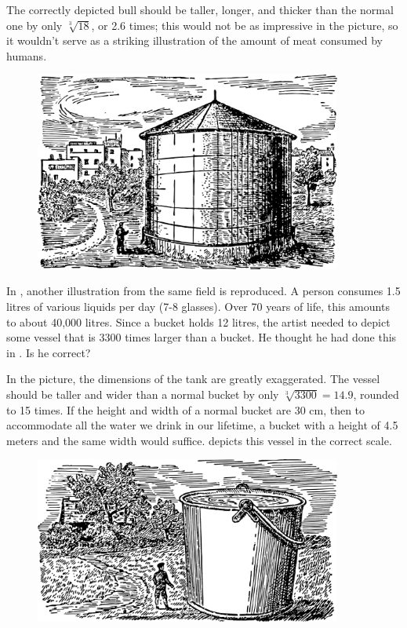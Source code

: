 The correctly depicted bull should be taller, longer, and thicker than the normal one by only $\sqrt[3]{18}$, or 2.6 times; this would not be as impressive in the picture, so it wouldn't serve as a striking illustration of the amount of meat consumed by humans.



\begin{figure}[h!]
\centering
\includegraphics[width=0.9\textwidth]{figures/ch-11/fig-171.pdf}
\end{figure}


\ques In , another illustration from the same field is reproduced. A person consumes 1.5 litres of various liquids per day (7-8 glasses). Over 70 years of life, this amounts to about 40,000 litres. Since a bucket holds 12 litres, the artist needed to depict some vessel that is 3300 times larger than a bucket. He thought he had done this in . Is he correct?


\ans In the picture, the dimensions of the tank are greatly exaggerated. The vessel should be taller and wider than a normal bucket by only $\sqrt[3]{3300} = 14.9$, rounded to 15 times. If the height and width of a normal bucket are 30 cm, then to accommodate all the water we drink in our lifetime, a bucket with a height of 4.5 meters and the same width would suffice.  depicts this vessel in the correct scale.


\begin{figure}[h!]
\centering
\includegraphics[width=0.9\textwidth]{figures/ch-11/fig-172.pdf}
\end{figure}

